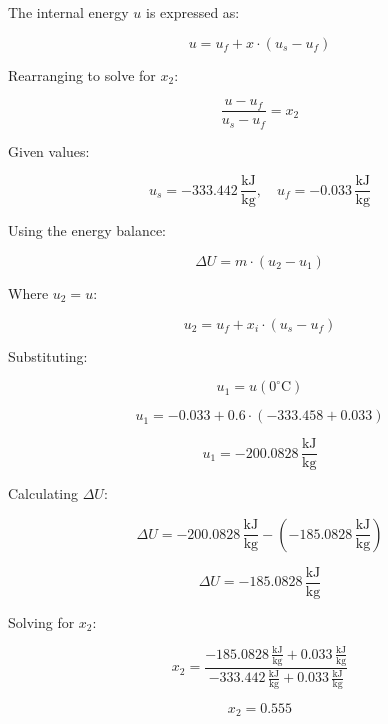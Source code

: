 The internal energy \( u \) is expressed as:  

\[
u = u_f + x \cdot (u_s - u_f)
\]

Rearranging to solve for \( x_2 \):  

\[
\frac{u - u_f}{u_s - u_f} = x_2
\]

Given values:  

\[
u_s = -333.442 \, \frac{\text{kJ}}{\text{kg}}, \quad u_f = -0.033 \, \frac{\text{kJ}}{\text{kg}}
\]

Using the energy balance:  

\[
\Delta U = m \cdot (u_2 - u_1)
\]

Where \( u_2 = u \):  

\[
u_2 = u_f + x_i \cdot (u_s - u_f)
\]

Substituting:  

\[
u_1 = u(0^\circ\text{C})
\]

\[
u_1 = -0.033 + 0.6 \cdot (-333.458 + 0.033)
\]

\[
u_1 = -200.0828 \, \frac{\text{kJ}}{\text{kg}}
\]

Calculating \( \Delta U \):  

\[
\Delta U = -200.0828 \, \frac{\text{kJ}}{\text{kg}} - (-185.0828 \, \frac{\text{kJ}}{\text{kg}})
\]

\[
\Delta U = -185.0828 \, \frac{\text{kJ}}{\text{kg}}
\]

Solving for \( x_2 \):  

\[
x_2 = \frac{-185.0828 \, \frac{\text{kJ}}{\text{kg}} + 0.033 \, \frac{\text{kJ}}{\text{kg}}}{-333.442 \, \frac{\text{kJ}}{\text{kg}} + 0.033 \, \frac{\text{kJ}}{\text{kg}}}
\]

\[
x_2 = 0.555
\]